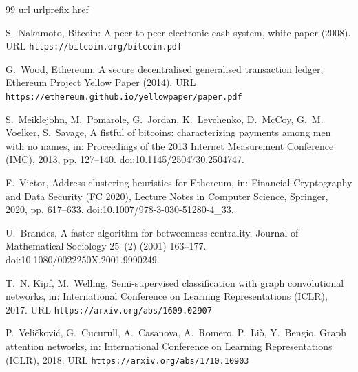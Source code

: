 \begin{thebibliography}{99}
\expandafter\ifx\csname url\endcsname\relax
  \def\url#1{\texttt{#1}}\fi
\expandafter\ifx\csname urlprefix\endcsname\relax\def\urlprefix{URL }\fi
\expandafter\ifx\csname href\endcsname\relax
  \def\href#1#2{#2} \def\path#1{#1}\fi

S.~Nakamoto, Bitcoin: A peer-to-peer electronic cash system, white paper
(2008).
\newline\urlprefix\url{https://bitcoin.org/bitcoin.pdf}

G.~Wood, Ethereum: A secure decentralised generalised transaction ledger,
Ethereum Project Yellow Paper (2014).
\newline\urlprefix\url{https://ethereum.github.io/yellowpaper/paper.pdf}

S.~Meiklejohn, M.~Pomarole, G.~Jordan, K.~Levchenko, D.~McCoy, G.~M. Voelker,
S.~Savage, A fistful of bitcoins: characterizing payments among men with no
names, in: Proceedings of the 2013 Internet Measurement Conference (IMC),
2013, pp. 127--140.
\newblock \href{https://doi.org/10.1145/2504730.2504747}{\path{doi:10.1145/2504730.2504747}}.

F.~Victor, Address clustering heuristics for {Ethereum}, in: Financial
Cryptography and Data Security (FC 2020), Lecture Notes in Computer Science,
Springer, 2020, pp. 617--633.
\newblock \href{https://doi.org/10.1007/978-3-030-51280-4_33}{\path{doi:10.1007/978-3-030-51280-4_33}}.

U.~Brandes, A faster algorithm for betweenness centrality, Journal of
Mathematical Sociology 25~(2) (2001) 163--177.
\newblock \href{https://doi.org/10.1080/0022250X.2001.9990249}{\path{doi:10.1080/0022250X.2001.9990249}}.

T.~N. Kipf, M.~Welling, Semi-supervised classification with graph
convolutional networks, in: International Conference on Learning
Representations (ICLR), 2017.
\newline\urlprefix\url{https://arxiv.org/abs/1609.02907}

P.~Veli{\v{c}}kovi{\'c}, G.~Cucurull, A.~Casanova, A.~Romero, P.~Li{\`o},
Y.~Bengio, Graph attention networks, in: International Conference on Learning
Representations (ICLR), 2018.
\newline\urlprefix\url{https://arxiv.org/abs/1710.10903}


\end{thebibliography}
